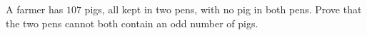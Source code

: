 A farmer has $107$ pigs, all kept in two pens, with no pig in both pens. Prove that the two pens cannot both contain an odd number of pigs.
